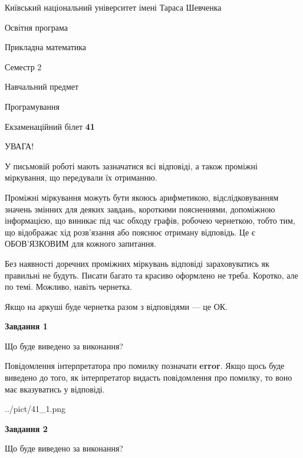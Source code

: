 \documentclass[12pt, ukrainian]{article}
\begin{document}
{{\begin {small}\par
{ \center  Київський національний університет імені Тараса Шевченка \par}
{\parbox {5 cm}{Освітня програма \hfill}{\parbox {7 cm}{Прикладна математика \hfill}}\parbox {6 cm}{\hfill Семестр 2}}\par
{\parbox {5 cm} {Навчальний предмет \hfill}\parbox {7 cm}{Програмування \hfill}\parbox {6cm}{\hfill}\par}\vspace{-7pt} \end{small}}{\center Екзаменаційний білет \No \textbf
{ 41 }\par}}
{
\begin {large}
УВАГА!

У письмовій роботі мають зазначатися всі відповіді, а також проміжні міркування, що передували їх отриманню.

Проміжні міркування можуть бути якоюсь арифметикою, відслідковуванням зна\-чень змінних для деяких завдань,
короткими поясненнями, допоміжною інформацією, що виникає під час обходу графів, робочею чернеткою,
тобто тим, що відображає хід розв’язання або пояснює отриману відповідь.
Це є ОБОВ’ЯЗКОВИМ для кожного запитання.

Без наявності доречних проміжних міркувань відповіді зараховуватись як правиль\-ні не будуть.
Писати багато та красиво оформлено не треба. Коротко, але по темі. Можли\-во, навіть чернетка.

Якщо на аркуші буде чернетка разом з відповідями --- це ОК.

\newpage

{\begin {center}\textbf{Завдання 1}\end {center}}\par
Що буде виведено за виконання?

Повідомлення інтерпретатора про помилку позначати \textbf{error}.
Якщо щось буде виведено до того, як інтерпретатор видасть повідомлення про помилку, 
то воно має вказуватись у відповіді. \par


\begin{center}
	{../pict/41_1.png}
\end{center}
\newpage

{\begin {center}\textbf{Завдання 2}\end {center}}\par
Що буде виведено за виконання?


\end{large}}
\end{document}
